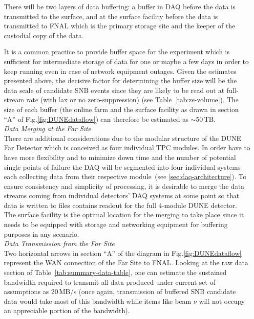 There will be two layers of data buffering: a buffer in DAQ before the data is transmitted to the surface,
and at the surface facility before the data is transmitted to FNAL which is the primary storage site and the
keeper of the custodial copy of the data.

It is a common practice to provide buffer space for the experiment which is sufficient for intermediate storage of data
for one or maybe a few days in order to keep running even in case of network equipment outages. Given the estimates
presented above, the decisive factor for determining the buffer size will be the data scale of candidate SNB events since
they are likely to be read out at full-stream rate (with lax or no zero-suppression) (see Table~\ref{tab:zs-volume}). The
size of each buffer (the online farm and the surface facility as drawn in section ``A'' of Fig.\ref{fig:DUNEdataflow})
can therefore be estimated as $\sim$50\,TB.
\ 
\\

\noindent
\textit{Data Merging at the Far Site} 
\ 
\\


\noindent
There are additional considerations due to the modular structure of the DUNE Far Detector
which is conceived as four individual TPC modules. In order have to have more flexibility and to minimize down time
and the number of potential single points of failure the DAQ will be segmented into four individual  systems each collecting
data from their respective module~(see \ref{sec:daq-architecture}). To ensure
consistency and simplicity of processing, it is desirable to merge the data streams coming from individual
detectors' DAQ systems at some point so that data is written to files contains readout for the full 4-module
DUNE detector. The surface facility is the optimal location for the merging to take place since it needs to be
equipped with storage and networking equipment for buffering purposes in any scenario.
\ 
\\

\noindent
\textit{Data Transmission from the Far Site} 
\ 
\\

\noindent
Two horizontal arrows in section ``A'' of the diagram in Fig.\ref{fig:DUNEdataflow} represent the WAN connection of
the Far Site to FNAL. Looking at the raw data section of Table~\ref{tab:summary-data-table}, one can estimate
the sustained bandwidth required to transmit all data produced under current set of assumptions as 20\,MB/s (once
again, transmission of buffered SNB candidate data would take most of this bandwidth while items like beam $\nu$
will not occupy an appreciable portion of the bandwidth).

